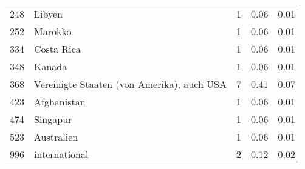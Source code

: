 \begin{longtable}{lXrrr}
        248 & \multicolumn{1}{X}{Libyen} & %
          \num{1} &
          \num[round-mode=places,round-precision=2]{0,06} &
          \num[round-mode=places,round-precision=2]{0,01} \\

        252 & \multicolumn{1}{X}{Marokko} & %
          \num{1} &
          \num[round-mode=places,round-precision=2]{0,06} &
          \num[round-mode=places,round-precision=2]{0,01} \\

        334 & \multicolumn{1}{X}{Costa Rica} & %
          \num{1} &
          \num[round-mode=places,round-precision=2]{0,06} &
          \num[round-mode=places,round-precision=2]{0,01} \\

        348 & \multicolumn{1}{X}{Kanada} & %
          \num{1} &
          \num[round-mode=places,round-precision=2]{0,06} &
          \num[round-mode=places,round-precision=2]{0,01} \\

        368 & \multicolumn{1}{X}{Vereinigte Staaten (von Amerika), auch USA} & %
          \num{7} &
          \num[round-mode=places,round-precision=2]{0,41} &
          \num[round-mode=places,round-precision=2]{0,07} \\

        423 & \multicolumn{1}{X}{Afghanistan} & %
          \num{1} &
          \num[round-mode=places,round-precision=2]{0,06} &
          \num[round-mode=places,round-precision=2]{0,01} \\

        474 & \multicolumn{1}{X}{Singapur} & %
          \num{1} &
          \num[round-mode=places,round-precision=2]{0,06} &
          \num[round-mode=places,round-precision=2]{0,01} \\

        523 & \multicolumn{1}{X}{Australien} & %
          \num{1} &
          \num[round-mode=places,round-precision=2]{0,06} &
          \num[round-mode=places,round-precision=2]{0,01} \\

        996 & \multicolumn{1}{X}{international} & %
          \num{2} &
          \num[round-mode=places,round-precision=2]{0,12} &
          \num[round-mode=places,round-precision=2]{0,02} \\


\end{longtable}
